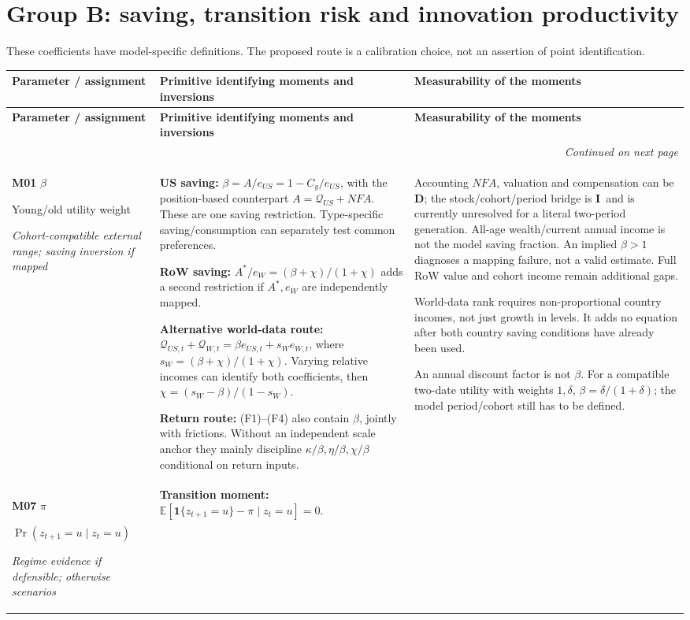 \documentclass[10pt,a4paper,landscape]{article}
\makeatletter
\newcommand{\Q}{\mathcal Q}\newcommand{\I}{\mathcal I}\newcommand{\D}{\mathcal D}
\newcommand{\direct}{\textbf{D}}
\newcommand{\indirect}{\textbf{I}}
\newcommand{\route}[1]{\par\textit{#1}}
\newenvironment{momenttable}{%
\fontsize{9.5}{11.2}\selectfont\setlength{\parskip}{3pt}
\begin{longtable}{@{}P{\dimexpr .16\textwidth-6.67pt\relax}P{\dimexpr .49\textwidth-6.67pt\relax}P{\dimexpr .35\textwidth-6.66pt\relax}@{}}
\toprule\rowcolor{tablehead}\textbf{Parameter / assignment} & \textbf{Primitive identifying moments and inversions} & \textbf{Measurability of the moments}\\\midrule
\endfirsthead
\toprule\rowcolor{tablehead}\textbf{Parameter / assignment} & \textbf{Primitive identifying moments and inversions} & \textbf{Measurability of the moments}\\\midrule
\endhead
\midrule\multicolumn{3}{r}{\footnotesize\itshape Continued on next page}\\\endfoot
\bottomrule\endlastfoot
}{\end{longtable}}
\makeatother
\begin{document}
\clearpage
\section{Group B: saving, transition risk and innovation productivity}
These coefficients have model-specific definitions. The proposed route is a calibration choice, not an assertion of point identification.
\begin{momenttable}
\textbf{M01} $\beta$\par Young/old utility weight\route{Cohort-compatible external range; saving inversion if mapped}
& \textbf{US saving:}
\(\beta=A/e_{US}=1-C_y/e_{US}\), with the position-based counterpart
\(A=\Q_{US}+NFA\).
These are one saving restriction. Type-specific saving/consumption can separately test common preferences.\par
\textbf{RoW saving:} $A^*/e_W=(\beta+\chi)/(1+\chi)$ adds a second restriction if $A^*,e_W$ are independently mapped.\par
\textbf{Alternative world-data route:}
\(\Q_{US,t}+\Q_{W,t}=\beta e_{US,t}+s_W e_{W,t}\),
where $s_W=(\beta+\chi)/(1+\chi)$. Varying relative incomes can identify both coefficients, then $\chi=(s_W-\beta)/(1-s_W)$.\par
\textbf{Return route:} (F1)--(F4) also contain $\beta$, jointly with frictions. Without an independent scale anchor they mainly discipline $\kappa/\beta,\eta/\beta,\chi/\beta$ conditional on return inputs.
& Accounting $NFA$, valuation and compensation can be \direct; the stock/cohort/period bridge is \indirect\ and is currently unresolved for a literal two-period generation. All-age wealth/current annual income is not the model saving fraction. An implied $\beta>1$ diagnoses a mapping failure, not a valid estimate. Full RoW value and cohort income remain additional gaps.\par
World-data rank requires non-proportional country incomes, not just growth in levels. It adds no equation after both country saving conditions have already been used.\par
An annual discount factor is not $\beta$. For a compatible two-date utility with weights $1,\delta$, $\beta=\delta/(1+\delta)$; the model period/cohort still has to be defined.\\[7pt]
\textbf{M07} $\pi$\par $\Pr(z_{t+1}=u\mid z_t=u)$\route{Regime evidence if defensible; otherwise scenarios}
& \textbf{Transition moment:}
\(\mathbb E[\mathbf1\{z_{t+1}=u\}-\pi\mid z_t=u]=0\).

\end{momenttable}
\end{document}
